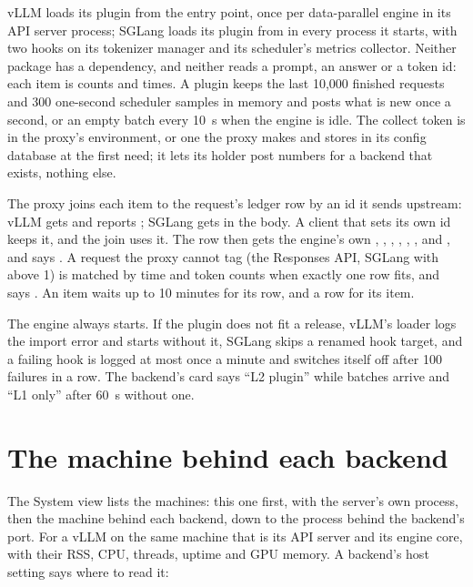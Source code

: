 vLLM loads its plugin from the  entry point, once per data-parallel engine in its API server process; SGLang loads its plugin from  in every process it starts, with two hooks on its tokenizer manager and its scheduler's metrics collector. Neither package has a dependency, and neither reads a prompt, an answer or a token id: each item is counts and times. A plugin keeps the last 10,000 finished requests and 300 one-second scheduler samples in memory and posts what is new once a second, or an empty batch every 10~s when the engine is idle. The collect token is  in the proxy's environment, or one the proxy makes and stores in its config database at the first need; it lets its holder post numbers for a backend that exists, nothing else.

The proxy joins each item to the request's ledger row by an id it sends upstream: vLLM gets  and reports ; SGLang gets  in the body. A client that sets its own id keeps it, and the join uses it. The row then gets the engine's own , , , , , ,  and , and  says . A request the proxy cannot tag (the Responses API, SGLang with  above 1) is matched by time and token counts when exactly one row fits, and says . An item waits up to 10 minutes for its row, and a row for its item.

The engine always starts. If the plugin does not fit a release, vLLM's loader logs the import error and starts without it, SGLang skips a renamed hook target, and a failing hook is logged at most once a minute and switches itself off after 100 failures in a row. The backend's card says \enquote{L2 plugin} while batches arrive and \enquote{L1 only} after 60~s without one.

\section{The machine behind each backend}\label{sec:hostcollect}

The System view lists the machines: this one first, with the server's own process, then the machine behind each backend, down to the process behind the backend's port. For a vLLM on the same machine that is its API server and its engine core, with their RSS, CPU, threads, uptime and GPU memory. A backend's host setting says where to read it:

